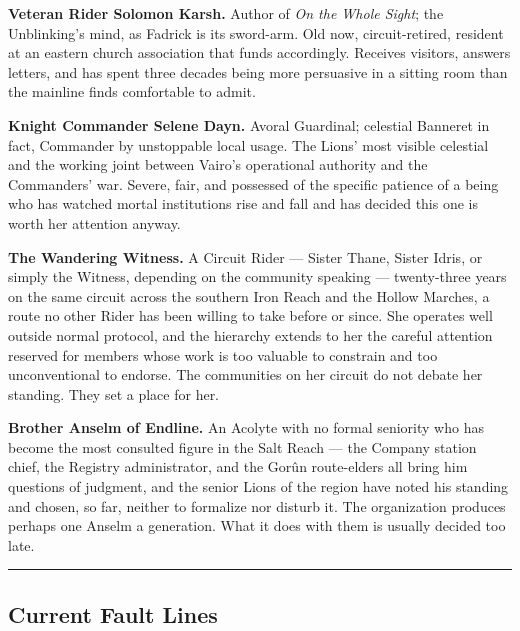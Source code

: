 \textbf{Veteran Rider Solomon Karsh.} Author of \textit{On the Whole Sight}; the Unblinking's mind, as Fadrick is its sword-arm. Old now, circuit-retired, resident at an eastern church association that funds accordingly. Receives visitors, answers letters, and has spent three decades being more persuasive in a sitting room than the mainline finds comfortable to admit.

\textbf{Knight Commander Selene Dayn.} Avoral Guardinal; celestial Banneret in fact, Commander by unstoppable local usage. The Lions' most visible celestial and the working joint between Vairo's operational authority and the Commanders' war. Severe, fair, and possessed of the specific patience of a being who has watched mortal institutions rise and fall and has decided this one is worth her attention anyway.

\textbf{The Wandering Witness.} A Circuit Rider --- Sister Thane, Sister Idris, or simply the Witness, depending on the community speaking --- twenty-three years on the same circuit across the southern Iron Reach and the Hollow Marches, a route no other Rider has been willing to take before or since. She operates well outside normal protocol, and the hierarchy extends to her the careful attention reserved for members whose work is too valuable to constrain and too unconventional to endorse. The communities on her circuit do not debate her standing. They set a place for her.

\textbf{Brother Anselm of Endline.} An Acolyte with no formal seniority who has become the most consulted figure in the Salt Reach --- the Company station chief, the Registry administrator, and the Gorûn route-elders all bring him questions of judgment, and the senior Lions of the region have noted his standing and chosen, so far, neither to formalize nor disturb it. The organization produces perhaps one Anselm a generation. What it does with them is usually decided too late.

\medskip\hrule\medskip

\subsection{Current Fault Lines}

